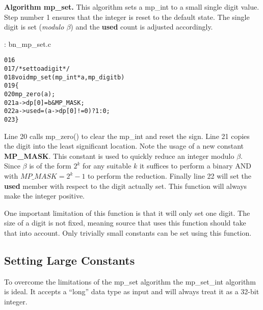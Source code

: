 \documentclass[b5paper]{book}
\begin{document}
\textbf{Algorithm mp\_set.}
This algorithm sets a mp\_int to a small single digit value.  Step number 1 ensures that the integer is reset to the default state.  The
single digit is set (\textit{modulo $\beta$}) and the \textbf{used} count is adjusted accordingly.

\vspace{+3mm}\begin{small}
\hspace{-5.1mm}{\bf File}: bn\_mp\_set.c
\vspace{-3mm}
\begin{alltt}
016   
017   /* set to a digit */
018   void mp_set (mp_int * a, mp_digit b)
019   \{
020     mp_zero (a);
021     a->dp[0] = b & MP_MASK;
022     a->used  = (a->dp[0] != 0) ? 1 : 0;
023   \}
\end{alltt}
\end{small}

Line 20 calls mp\_zero() to clear the mp\_int and reset the sign.  Line 21 copies the digit 
into the least significant location.  Note the usage of a new constant \textbf{MP\_MASK}.  This constant is used to quickly
reduce an integer modulo $\beta$.  Since $\beta$ is of the form $2^k$ for any suitable $k$ it suffices to perform a binary AND with 
$MP\_MASK = 2^k - 1$ to perform the reduction.  Finally line 22 will set the \textbf{used} member with respect to the 
digit actually set. This function will always make the integer positive.

One important limitation of this function is that it will only set one digit.  The size of a digit is not fixed, meaning source that uses 
this function should take that into account.  Only trivially small constants can be set using this function.

\subsection{Setting Large Constants}
To overcome the limitations of the mp\_set algorithm the mp\_set\_int algorithm is ideal.  It accepts a ``long''
data type as input and will always treat it as a 32-bit integer.
\end{document}
